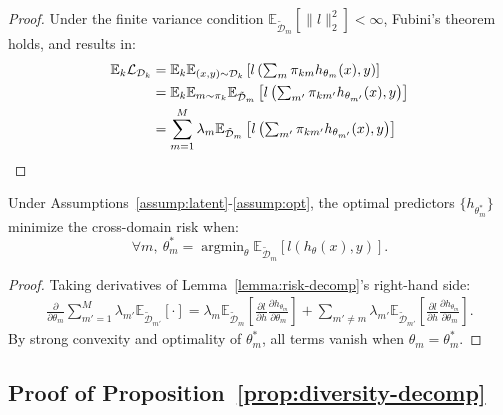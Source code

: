 \begin{proof}
Under the finite variance condition \(\mathbb{E}_{\tilde{\mathcal{D}}_m}[\|l\|_2^2] < \infty\), Fubini's theorem holds, and results in:
\begin{align}
    \mathbb{E}_k \mathcal{L}_{\mathcal{D}_k} &= \mathbb{E}_k \mathbb{E}_{(x,y)\sim\mathcal{D}_k}\left[l\left(\textstyle\sum_m \pi_{km}h_{\theta_m}(x), y\right)\right] \notag \\ 
    &= \mathbb{E}_k \mathbb{E}_{m\sim\pi_k} \mathbb{E}_{\tilde{\mathcal{D}}_m}\left[l\left(\textstyle\sum_{m'} \pi_{km'}h_{\theta_{m'}}(x), y\right)\right] \notag \\ 
    &= \sum_{m=1}^M \lambda_m \mathbb{E}_{\tilde{\mathcal{D}}_m}\left[l\left(\textstyle\sum_{m'} \pi_{km'}h_{\theta_{m'}}(x), y\right)\right]
\end{align}

\end{proof}

\begin{theorem}
\label{thm:global-opt}
Under Assumptions~\ref{assump:latent}-\ref{assump:opt}, the optimal predictors \(\{h_{\theta_m^*}\}\) minimize the cross-domain risk when:
\begin{equation}
    \forall m,\ \theta_m^* = \mathop{\mathrm{argmin}}_{\theta} \mathbb{E}_{\tilde{\mathcal{D}}_m}[l(h_\theta(x), y)].
\end{equation}
\end{theorem}

\begin{proof}
Taking derivatives of Lemma~\ref{lemma:risk-decomp}'s right-hand side:
\begin{align*}
    \frac{\partial}{\partial \theta_m} \sum_{m'=1}^M \lambda_{m'} \mathbb{E}_{\tilde{\mathcal{D}}_{m'}}[\cdot] = \lambda_m \mathbb{E}_{\tilde{\mathcal{D}}_m}\left[\frac{\partial l}{\partial h}\frac{\partial h_{\theta_m}}{\partial \theta_m}\right]  + \sum_{m'\neq m} \lambda_{m'} \mathbb{E}_{\tilde{\mathcal{D}}_{m'}}\left[\frac{\partial l}{\partial h}\frac{\partial h_{\theta_m}}{\partial \theta_m}\right].
\end{align*}
By strong convexity and optimality of \(\theta_m^*\), all terms vanish when \(\theta_m = \theta_m^*\).
\end{proof}

\subsection{Proof of Proposition~\ref{prop:diversity-decomp}}
\label{sec:appendix-proof-prop4.4}
